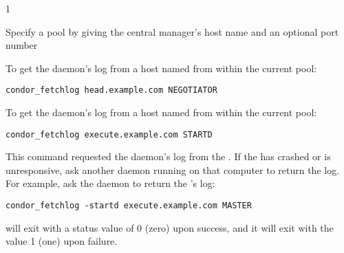 \begin{ManPage}{\label{man-condor-fetchlog}}{1}
\begin{Options}
    \ToolArgsBaseDesc
    {Specify a pool by giving the central manager's host name
    and an optional port number}
\end{Options}

\Examples
To get the  daemon's log from a host named 
 from within the current pool:
\begin{verbatim}
condor_fetchlog head.example.com NEGOTIATOR
\end{verbatim}

To get the  daemon's log from a host named
 from within the current pool:
\begin{verbatim}
condor_fetchlog execute.example.com STARTD
\end{verbatim}

This command requested the  daemon's log from the
.
If the  has crashed or is unresponsive,
ask another daemon
running on that computer to return the log.
For example, ask the  daemon to return the
's log:

\begin{verbatim}
condor_fetchlog -startd execute.example.com MASTER
\end{verbatim}

\ExitStatus
{} will exit with a status value of 0 (zero) upon success,
and it will exit with the value 1 (one) upon failure.

\end{ManPage}
